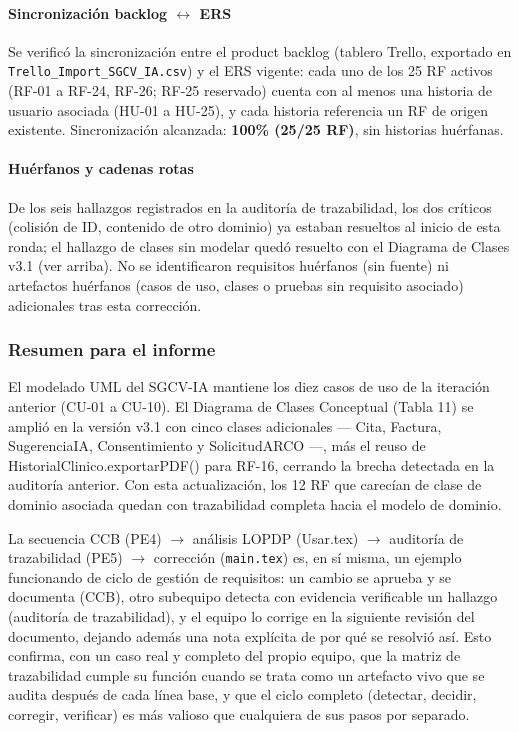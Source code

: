 \paragraph{Sincronización backlog $\leftrightarrow$ ERS}

Se verificó la sincronización entre el product backlog (tablero
Trello, exportado en \texttt{Trello\_Import\_SGCV\_IA.csv}) y el ERS
vigente: cada uno de los 25 RF activos (RF-01 a RF-24, RF-26; RF-25
reservado) cuenta con al menos una historia de usuario asociada
(HU-01 a HU-25), y cada historia referencia un RF de origen
existente. Sincronización alcanzada: \textbf{100\% (25/25 RF)}, sin
historias huérfanas.

\paragraph{Huérfanos y cadenas rotas}

De los seis hallazgos registrados en la auditoría de trazabilidad,
los dos críticos (colisión de ID, contenido de otro dominio) ya
estaban resueltos al inicio de esta ronda; el hallazgo de clases sin
modelar quedó resuelto con el Diagrama de Clases v3.1 (ver arriba).
No se identificaron requisitos huérfanos (sin fuente) ni artefactos
huérfanos (casos de uso, clases o pruebas sin requisito asociado)
adicionales tras esta corrección.

\subsubsection{Resumen para el informe}

El modelado UML del SGCV-IA mantiene los diez casos de uso de la
iteración anterior (CU-01 a CU-10). El Diagrama de Clases Conceptual
(Tabla 11) se amplió en la versión v3.1 con cinco clases adicionales
--- Cita, Factura, SugerenciaIA, Consentimiento y SolicitudARCO ---,
más el reuso de HistorialClinico.exportarPDF() para RF-16, cerrando
la brecha detectada en la auditoría anterior. Con esta actualización,
los 12 RF que carecían de clase de dominio asociada quedan con
trazabilidad completa hacia el modelo de dominio.

La secuencia CCB (PE4) $\rightarrow$ análisis LOPDP (Usar.tex)
$\rightarrow$ auditoría de trazabilidad (PE5) $\rightarrow$
corrección (\texttt{main.tex}) es, en sí misma, un ejemplo
funcionando de ciclo de gestión de requisitos: un cambio se aprueba
y se documenta (CCB), otro subequipo detecta con evidencia
verificable un hallazgo (auditoría de trazabilidad), y el equipo lo
corrige en la siguiente revisión del documento, dejando además una
nota explícita de por qué se resolvió así. Esto confirma, con un
caso real y completo del propio equipo, que la matriz de
trazabilidad cumple su función cuando se trata como un artefacto
vivo que se audita después de cada línea base, y que el ciclo
completo (detectar, decidir, corregir, verificar) es más valioso que
cualquiera de sus pasos por separado.
